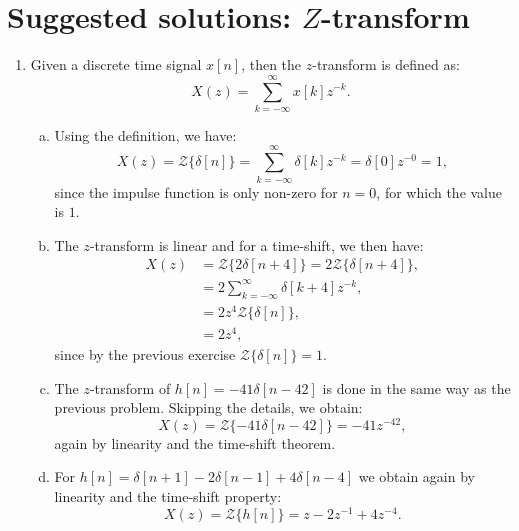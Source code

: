 
\newpage
\section{Suggested solutions: $Z$-transform}

\begin{enumerate}
    \item Given a discrete time signal $x[n]$, then the $z$-transform is defined as:
          \[X(z)=\sum_{k=-\infty}^{\infty}x[k]z^{-k}.\]

          \begin{enumerate}[a)]

              \item Using the definition, we have:
                    \[X(z)=\mathcal{Z}\{\delta[n]\}=\sum_{k=-\infty}^{\infty}\delta[k]z^{-k}=\delta[0]z^{-0}=1,\]
                    since the impulse function is only non-zero for $n=0$, for which the value is $1$.

              \item The $z$-transform is linear and for a time-shift, we then have:
                    \begin{align*}
                        X(z) & =\mathcal{Z}\{2\delta[n+4]\}=2\mathcal{Z}\{\delta[n+4]\}, \\
                             & =2\sum_{k=-\infty}^{\infty}\delta[k+4]z^{-k},             \\
                             & =2z^{4}\mathcal{Z}\{\delta[n]\},                          \\
                             & =2z^{4},
                    \end{align*}
                    since by the previous exercise $\mathcal{Z}\{\delta[n]\}=1$.

              \item The $z$-transform of $h[n]=-41\delta[n-42]$ is done in the same way as the previous problem. Skipping the details, we obtain:
                    \[X(z)=\mathcal{Z}\{-41\delta[n-42]\}=-41z^{-42},\]
                    again by linearity and the time-shift theorem.

              \item For $h[n]=\delta[n+1]-2\delta[n-1]+4\delta[n-4]$ we obtain again by linearity and the time-shift property:
                    \[X(z)=\mathcal{Z}\{h[n]\}=z-2z^{-1}+4z^{-4}.\]
          \end{enumerate}


\end{enumerate}
